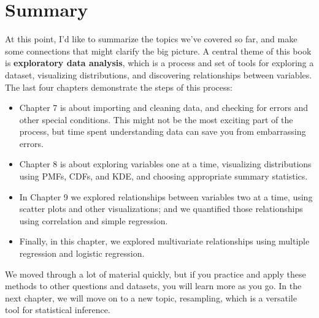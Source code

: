 \section{Summary}\label{summary}

At this point, I'd like to summarize the topics we've covered so far,
and make some connections that might clarify the big picture. A central
theme of this book is \textbf{exploratory data analysis}, which is a
process and set of tools for exploring a dataset, visualizing
distributions, and discovering relationships between variables. The last
four chapters demonstrate the steps of this process:

\begin{itemize}
\item
  Chapter 7 is about importing and cleaning data, and checking for
  errors and other special conditions. This might not be the most
  exciting part of the process, but time spent understanding data can
  save you from embarrassing errors.
\item
  Chapter 8 is about exploring variables one at a time, visualizing
  distributions using PMFs, CDFs, and KDE, and choosing appropriate
  summary statistics.
\item
  In Chapter 9 we explored relationships between variables two at a
  time, using scatter plots and other visualizations; and we quantified
  those relationships using correlation and simple regression.
\item
  Finally, in this chapter, we explored multivariate relationships using
  multiple regression and logistic regression.
\end{itemize}

We moved through a lot of material quickly, but if you practice and
apply these methods to other questions and datasets, you will learn more
as you go. In the next chapter, we will move on to a new topic,
resampling, which is a versatile tool for statistical inference.

